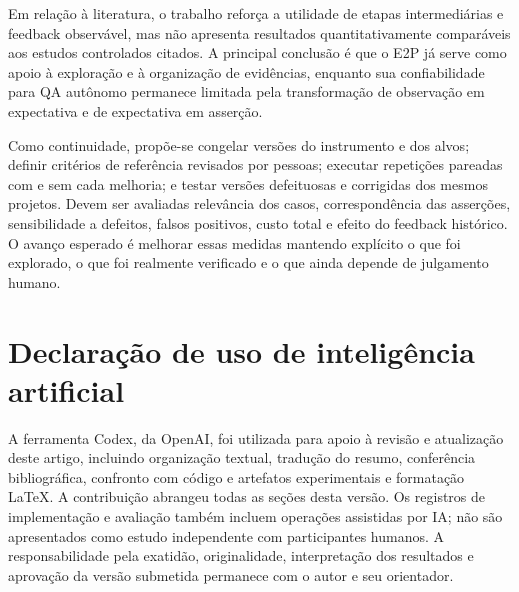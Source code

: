 \documentclass[12pt]{article}
\begin{document}
Em relação à literatura, o trabalho reforça a utilidade de etapas intermediárias e feedback observável, mas não apresenta resultados quantitativamente comparáveis aos estudos controlados citados. A principal conclusão é que o E2P já serve como apoio à exploração e à organização de evidências, enquanto sua confiabilidade para QA autônomo permanece limitada pela transformação de observação em expectativa e de expectativa em asserção.

Como continuidade, propõe-se congelar versões do instrumento e dos alvos; definir critérios de referência revisados por pessoas; executar repetições pareadas com e sem cada melhoria; e testar versões defeituosas e corrigidas dos mesmos projetos. Devem ser avaliadas relevância dos casos, correspondência das asserções, sensibilidade a defeitos, falsos positivos, custo total e efeito do feedback histórico. O avanço esperado é melhorar essas medidas mantendo explícito o que foi explorado, o que foi realmente verificado e o que ainda depende de julgamento humano.

\section*{Declaração de uso de inteligência artificial}
A ferramenta Codex, da OpenAI, foi utilizada para apoio à revisão e atualização deste artigo, incluindo organização textual, tradução do resumo, conferência bibliográfica, confronto com código e artefatos experimentais e formatação LaTeX. A contribuição abrangeu todas as seções desta versão. Os registros de implementação e avaliação também incluem operações assistidas por IA; não são apresentados como estudo independente com participantes humanos. A responsabilidade pela exatidão, originalidade, interpretação dos resultados e aprovação da versão submetida permanece com o autor e seu orientador.



\end{document}
